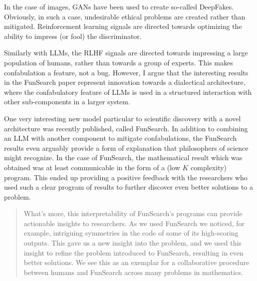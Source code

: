 In the case of images, GANs have been used to create so-called DeepFakes.  Obviously, in such a case, undesirable ethical problems are created rather than mitigated.  Reinforcement learning signals are directed towards optimizing the ability to impress (or fool) the discriminator.

Similarly with LLMs, the RLHF signals are directed towards impressing a large population of humans, rather than towards a group of experts.  This makes confabulation a feature, not a bug.  However, I argue that the interesting results in the FunSearch paper represent innovation towards a dialectical architecture, where the confabulatory feature of LLMs is used in a structured interaction with other sub-components in a larger system.



One very interesting new model particular to scientific discovery with a novel architecture was recently published, called FunSearch.  \citep{FunSearch2024}  In addition to combining an LLM with another component to mitigate confabulations, the FunSearch results even arguably provide a form of explanation that philosophers of science might recognize.  In the case of FunSearch, the mathematical result which was obtained was at least communicable in the form of a (low $K$ complexity) program. This ended up providing a positive feedback with the researchers who used such a clear program of results to further discover even better solutions to a problem. 


\begin{quote}
    What’s more, this interpretability of FunSearch’s programs can provide actionable insights to researchers. As we used FunSearch we noticed, for example, intriguing symmetries in the code of some of its high-scoring outputs. This gave us a new insight into the problem, and we used this insight to refine the problem introduced to FunSearch, resulting in even better solutions. We see this as an exemplar for a collaborative procedure between humans and FunSearch across many problems in mathematics.

    \citep{FunSearch2024}
\end{quote}


